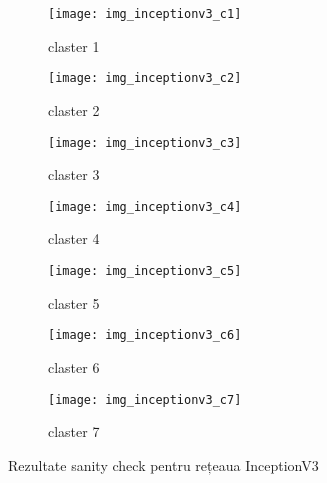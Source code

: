 \begin{figure}[!tbp]
  \centering
  \begin{subfigure}[b]{0.45\textwidth}
    \texttt{[image: img\_inceptionv3\_c1]}
    \caption{claster 1}
  \end{subfigure}
  \hfill
  \begin{subfigure}[b]{0.45\textwidth}
    \texttt{[image: img\_inceptionv3\_c2]}
    \caption{claster 2}
  \end{subfigure}
   \hfill
  \begin{subfigure}[b]{0.45\textwidth}
    \texttt{[image: img\_inceptionv3\_c3]}
    \caption{claster 3}
  \end{subfigure}
  \hfill
  \begin{subfigure}[b]{0.45\textwidth}
    \texttt{[image: img\_inceptionv3\_c4]}
    \caption{claster 4}
  \end{subfigure}
  \hfill
  \begin{subfigure}[b]{0.45\textwidth}
    \texttt{[image: img\_inceptionv3\_c5]}
    \caption{claster 5}
  \end{subfigure}
  \hfill
  \begin{subfigure}[b]{0.45\textwidth}
    \texttt{[image: img\_inceptionv3\_c6]}
    \caption{claster 6}
  \end{subfigure}
    \hfill
  \begin{subfigure}[b]{0.45\textwidth}
    \texttt{[image: img\_inceptionv3\_c7]}
    \caption{claster 7}
  \end{subfigure}
  \caption[Rezultate sanity check pentru rețeaua InceptionV3]{Rezultate sanity check pentru rețeaua InceptionV3}
\end{figure}

